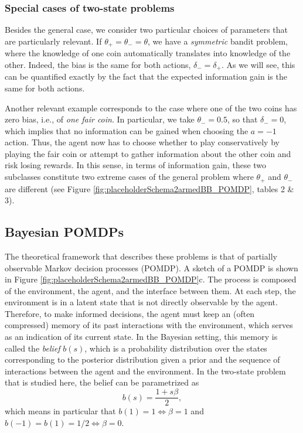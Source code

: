\documentclass[aps,nofootinbib,groupaddress,superscriptaddress,reprint,amsmath,amssymb,graphicx,onecolumn,prx]{revtex4-2}
\begin{document}
\subsubsection{Special cases of two-state problems}
\noindent Besides the general case, we consider two particular choices of parameters that are particularly relevant. If $\theta_+ = \theta_- = \theta$, we have a \textit{symmetric} bandit problem, where the knowledge of one coin automatically translates into knowledge of the other. Indeed, the bias is the same for both actions, $\delta_-=\delta_+$. As we will see, this can be quantified exactly by the fact that the expected information gain is the same for both actions.

Another relevant example corresponds to the case where one of the two coins has zero bias, i.e., of \textit{one fair coin}. In particular, we take $\theta_- = 0.5$, so that $\delta_- = 0$, which implies that no information can be gained when choosing the $a = -1$ action. Thus, the agent now has to choose whether to play conservatively by playing the fair coin or attempt to gather information about the other coin and risk losing rewards. In this sense, in terms of information gain, these two subclasses constitute two extreme cases of the general problem where $\theta_+$ and $\theta_-$ are different (see Figure \ref{fig:placeholderSchema2armedBB_POMDP}, tables 2 \& 3).


\subsection{Bayesian POMDPs}
\noindent The theoretical framework that describes these problems is that of partially observable Markov decision processes (POMDP). A sketch of a POMDP is shown in Figure \ref{fig:placeholderSchema2armedBB_POMDP}c. The process is composed of the environment, the agent, and the interface between them. At each step, the environment is in a latent state that is not directly observable by the agent. Therefore, to make informed decisions, the agent must keep an (often compressed) memory of its past interactions with the environment, which serves as an indication of its current state. In the Bayesian setting, this memory is called the \textit{belief} $b(s)$, which is a probability distribution over the states corresponding to the posterior distribution given a prior and the sequence of interactions between the agent and the environment. %
In the two-state problem that is studied here, the belief can be parametrized as 
\begin{equation}
    b(s)=\frac{1+s\beta }{2},
    \label{eq:belief_parametrization}
\end{equation}
which means in particular that $b(1)=1 \iff \beta=1$ and $b(-1)=b(1)=1/2\iff \beta=0$.
\end{document}
